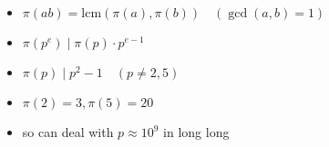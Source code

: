 \begin{itemize}
    \item $\pi (ab) = \text{lcm} (\pi (a), \pi(b)) \quad (\gcd (a, b) = 1)$
    \item $\pi (p^e) \mid \pi (p) \cdot p^{e - 1}$
    \item $\pi (p) \mid p^2 - 1 \quad (p \neq 2, 5)$
    \item $\pi (2) = 3, \pi (5) = 20$
    \item so can deal with $p \approx 10^9$ in long long
\end{itemize}